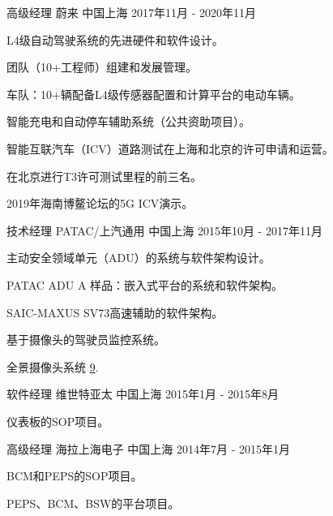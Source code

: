 \documentclass[../cv_xin_cn.tex]{subfiles}
\begin{document}
\begin{cventries}
  \cventry
    {高级经理} %
    {蔚来} %
    {中国上海} %
    {2017年11月 - 2020年11月} %
    {
      \begin{cvitems}
        \item L4级自动驾驶系统的先进硬件和软件设计。
        \item 团队（10+工程师）组建和发展管理。
        \item 车队：10+辆配备L4级传感器配置和计算平台的电动车辆。
        \item 智能充电和自动停车辅助系统（公共资助项目）。
        \item 智能互联汽车（ICV）道路测试在上海和北京的许可申请和运营。
        \item 在北京进行T3许可测试里程的前三名。
        \item 2019年海南博鳌论坛的5G ICV演示。
      \end{cvitems}
    }

  \cventry
    {技术经理} %
    {PATAC/上汽通用} %
    {中国上海} %
    {2015年10月 - 2017年11月} %
    {
      \begin{cvitems}
        \item 主动安全领域单元（ADU）的系统与软件架构设计。
        \item PATAC ADU A 样品：嵌入式平台的系统和软件架构。
        \item SAIC-MAXUS SV73高速辅助的软件架构。
        \item 基于摄像头的驾驶员监控系统。
        \item 全景摄像头系统 \hyperlink{Xin_RearView_17}{9}.
      \end{cvitems}
    }


  \cventry
    {软件经理} %
    {维世特亚太} %
    {中国上海} %
    {2015年1月 - 2015年8月} %
    {
      \begin{cvitems}
        \item 仪表板的SOP项目。
      \end{cvitems}
    }

  \cventry
    {高级经理} %
    {海拉上海电子} %
    {中国上海} %
    {2014年7月 - 2015年1月} %
    {
      \begin{cvitems}
        \item BCM和PEPS的SOP项目。
        \item PEPS、BCM、BSW的平台项目。
      \end{cvitems}
    }


\end{cventries}
\end{document}
